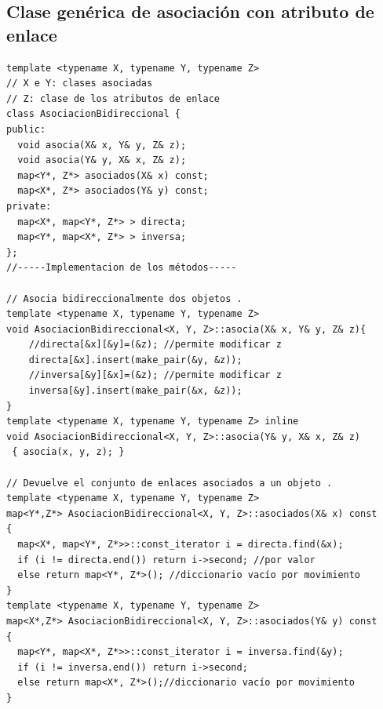 \subsection{Clase genérica de asociación con atributo de enlace}
\begin{center}
	\begin{lstlisting}[frame=single]
template <typename X, typename Y, typename Z> 
// X e Y: clases asociadas
// Z: clase de los atributos de enlace
class AsociacionBidireccional {
public:
  void asocia(X& x, Y& y, Z& z);
  void asocia(Y& y, X& x, Z& z);
  map<Y*, Z*> asociados(X& x) const;
  map<X*, Z*> asociados(Y& y) const;
private:
  map<X*, map<Y*, Z*> > directa;
  map<Y*, map<X*, Z*> > inversa;
};
//-----Implementacion de los métodos-----

// Asocia bidireccionalmente dos objetos .
template <typename X, typename Y, typename Z>
void AsociacionBidireccional<X, Y, Z>::asocia(X& x, Y& y, Z& z){
	//directa[&x][&y]=(&z); //permite modificar z
	directa[&x].insert(make_pair(&y, &z));
	//inversa[&y][&x]=(&z); //permite modificar z
	inversa[&y].insert(make_pair(&x, &z));
}
template <typename X, typename Y, typename Z> inline
void AsociacionBidireccional<X, Y, Z>::asocia(Y& y, X& x, Z& z)
 { asocia(x, y, z); }
 
// Devuelve el conjunto de enlaces asociados a un objeto .
template <typename X, typename Y, typename Z>
map<Y*,Z*> AsociacionBidireccional<X, Y, Z>::asociados(X& x) const
{
  map<X*, map<Y*, Z*>>::const_iterator i = directa.find(&x);
  if (i != directa.end()) return i->second; //por valor
  else return map<Y*, Z*>(); //diccionario vacío por movimiento
}
template <typename X, typename Y, typename Z>
map<X*,Z*> AsociacionBidireccional<X, Y, Z>::asociados(Y& y) const
{
  map<Y*, map<X*, Z*>>::const_iterator i = inversa.find(&y);
  if (i != inversa.end()) return i->second;
  else return map<X*, Z*>();//diccionario vacío por movimiento
}
\end{lstlisting}
\end{center}